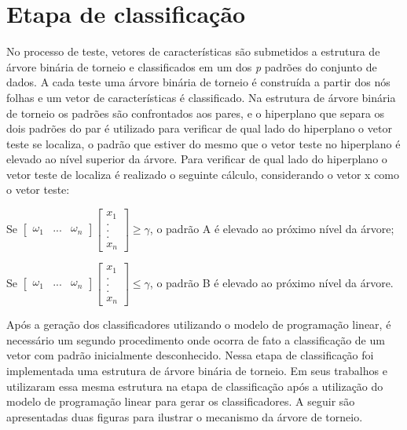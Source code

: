 \section{Etapa de classificação}
No processo de teste, vetores de características são submetidos a estrutura de árvore binária de torneio e classificados em um dos \textit{p} padrões do conjunto de dados.
A cada teste uma árvore binária de torneio é construída a partir dos nós folhas e um vetor de características é classificado. Na estrutura de árvore binária de torneio os padrões são confrontados aos pares, e o hiperplano que separa os dois padrões do par é utilizado para verificar de qual lado do hiperplano o vetor teste se localiza, o padrão que estiver do mesmo que o vetor teste no hiperplano é elevado ao nível superior da árvore. Para verificar de qual lado do hiperplano o vetor teste de localiza é realizado o seguinte cálculo, considerando o vetor x como o vetor teste:

Se $ \begin{bmatrix}
\omega _{1} & ... & \omega _{n} 
\end{bmatrix}
\begin{bmatrix}
x_{1}
\\ 
.
\\
. 
\\
. 
\\
x_{n}
\end{bmatrix}
\geq \gamma $, o padrão A é elevado ao próximo nível da árvore;

Se $ \begin{bmatrix}
\omega _{1} & ... & \omega _{n} 
\end{bmatrix}
\begin{bmatrix}
x_{1}
\\ 
.
\\
. 
\\
. 
\\
x_{n}
\end{bmatrix}
\leq  \gamma $, o padrão B é elevado ao próximo nível da árvore.

Após a geração dos classificadores utilizando o modelo de programação linear, é necessário um segundo procedimento onde ocorra de fato a classificação de um vetor com padrão inicialmente desconhecido. Nessa etapa de classificação foi implementada uma estrutura de árvore binária de torneio. Em seus trabalhos  e  utilizaram essa mesma estrutura na etapa de classificação após a utilização do modelo de programação linear para gerar os classificadores.
A seguir são apresentadas duas figuras para ilustrar o mecanismo da árvore de torneio.


